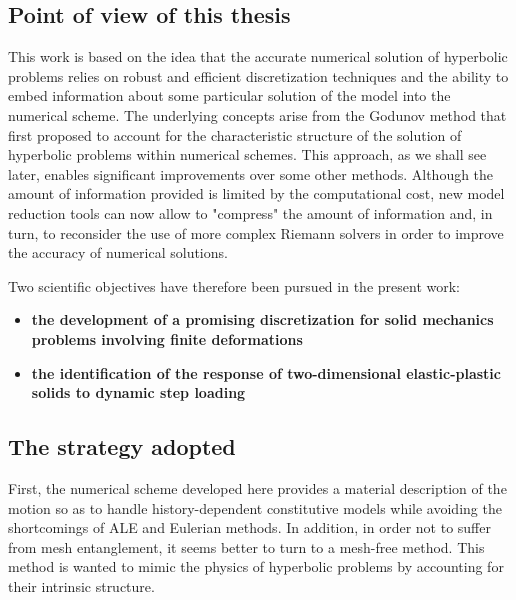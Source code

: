 \subsection{Point of view of this thesis}

This work is based on the idea that the accurate numerical solution of hyperbolic problems relies on robust and efficient discretization techniques and the ability to embed information about some particular solution of the model into the numerical scheme.
The underlying concepts arise from the Godunov method \cite{Godunov_method} that first proposed to account for the characteristic structure of the solution of hyperbolic problems within numerical schemes.
This approach, as we shall see later, enables significant improvements over some other methods.
Although the amount of information provided is limited by the computational cost, new model reduction tools can now allow to "compress" the amount of information and, in turn, to reconsider the use of more complex Riemann solvers in order to improve the accuracy of numerical solutions.

Two scientific objectives have therefore been pursued in the present work:
\begin{itemize}
\item \textbf{the development of a promising discretization for solid mechanics problems involving finite deformations}
\item \textbf{the identification of the response of two-dimensional elastic-plastic solids to dynamic step loading}
\end{itemize}

\subsection{The strategy adopted}
First, the numerical scheme developed here provides a material description of the motion so as to handle history-dependent constitutive models while avoiding the shortcomings of ALE and Eulerian methods.
In addition, in order not to suffer from mesh entanglement, it seems better to turn to a mesh-free method.
This method is wanted to mimic the physics of hyperbolic problems by accounting for their intrinsic structure.

